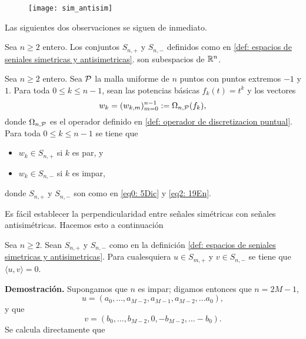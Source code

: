 \begin{figure}[H]
	\centering
	\texttt{[image: sim\_antisim]} 
\end{figure}	

Las siguientes dos observaciones se siguen de inmediato.
\begin{obs}
\label{obs: espacios de senales sim y antisim}
Sea $n \geq 2$ entero.  
Los conjuntos $S_{n,+}$ y $S_{n,-}$ definidos como en  
\ref{def: espacios de seniales simetricas y antisimetricas}. 
son subespacios de $\mathbb{R}^{n}$.
\end{obs}

\begin{obs}
\label{obs: pertenencia}
Sea $n \geq 2$ entero.  
Sea $\mathcal{P}$ la malla
uniforme de $n$ puntos con puntos extremos $-1$ y $1$.
Para toda $0 \leq k \leq n-1$, sean
las potencias básicas $f_{k}(t)=t^{k}$ y los vectores
\begin{equation}
\label{eq4: 10Dic}
w_{k}=(w_{k,m})_{m=0}^{n-1} := \Omega_{n, \mathcal{P}}(f_{k}),
\end{equation}
donde $\Omega_{n, \mathcal{P}}$ es el operador definido en 
\ref{def: operador de discretizacion puntual}.
Para toda $0 \leq k \leq n-1$ se tiene que
\begin{itemize}
\item $w_{k} \in S_{n,+}$ si $k$ es par, y
\item $w_{k} \in S_{n,-}$ si $k$ es impar,
\end{itemize}
donde $S_{n,+}$ y $S_{n,-}$ son como en 
\eqref{eq0: 5Dic} y \eqref{eq2: 19En}.
\end{obs}

Es fácil establecer la perpendicularidad entre
señales simétricas con señales antisimétricas.
Hacemos esto a continuación

\begin{lema}
\label{lema: ortogonalidad entre sim y antisim}
Sea $n \geq 2$.
Sean $S_{n,+}$ y $S_{n,-}$ como en la definición
\ref{def: espacios de seniales simetricas y antisimetricas}.
Para cualesquiera 
$u \in S_{m,+}$ y $v \in S_{n,-}$ se tiene que
$\langle u, v \rangle=0$.
\end{lema}
\noindent
\textbf{Demostración.}
Supongamos que $n$ es impar; digamos entonces que
$n = 2M-1$, 
\begin{equation*}
u=(a_{0}, \ldots , a_{M-2}, a_{M-1}, a_{M-2}, \ldots a_{0}),
\end{equation*}
y que 
\begin{equation*}
v=(b_{0}, \ldots , b_{M-2}, 0, -b_{M-2}, \ldots -b_{0}).
\end{equation*}
Se calcula directamente que 

